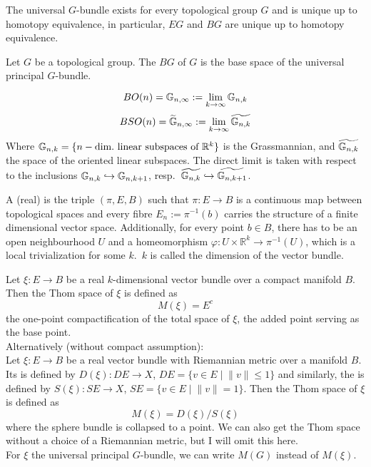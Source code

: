 \documentclass[a4paper,11pt]{article}
\begin{document}
\begin{remark}
    The universal \(G\)-bundle exists for every topological group \(G\) and is unique up to homotopy equivalence, in particular, \(EG\) and \(BG\) are unique up to homotopy equivalence.
\end{remark}

\begin{definition}
    Let \(G\) be a topological group. The  \(BG\) of \(G\) is the base space of the universal principal \(G\)-bundle.
\end{definition}

\begin{remark}\cite[p.32]{thom}
    \[BO(n)=\mathbb{G}_{n,\infty}:=\lim_{k\to\infty}\mathbb{G}_{n,k}\]
    \[BSO(n)=\widetilde{\mathbb{G}}_{n,\infty}:=\lim_{k\to\infty}\widetilde{\mathbb{G}_{n,k}}\]
    Where \(\mathbb{G}_{n,k}=\{n-\text{dim.\ linear subspaces of }\mathbb{R}^k\}\) is the Grassmannian, and \(\widetilde{\mathbb{G}_{n,k}}\) the space of the oriented linear subspaces. The direct limit is taken with respect to the inclusions \(\mathbb{G}_{n,k}\hookrightarrow\mathbb{G}_{n,k+1}\), resp.\ \(\widetilde{\mathbb{G}_{n,k}}\hookrightarrow\widetilde{\mathbb{G}_{n,k+1}}\).
\end{remark}

\begin{definition}
    A (real)  is the triple \((\pi,E,B)\) such that \(\pi:E\to B\) is a continuous map between topological spaces and every fibre \(E_n:=\pi^{-1}(b)\) carries the structure of a finite dimensional vector space.
    Additionally, for every point \(b\in B\), there has to be an open neighbourhood \(U\) and a homeomorphism \(\varphi:U\times\mathbb{R}^k\to\pi^{-1}(U)\), which is a local trivialization for some \(k\).\ \(k\) is called the dimension of the vector bundle.
\end{definition}

\begin{definition}
    Let \(\xi:E\to B\) be a real \(k\)-dimensional vector bundle over a compact manifold \(B\).
    Then the Thom space of \(\xi\) is defined as\[M(\xi)=E^c\] the one-point compactification of the total space of \(\xi\), the added point serving as the base point.\\
    Alternatively (without compact assumption):\\
    Let \(\xi:E\to B\) be a real vector bundle with Riemannian metric over a manifold \(B\). Its  is defined by \(D(\xi):DE\to X\), \(DE=\{v\in E\mid \lVert v\rVert \leq 1\}\) and similarly, the  is defined by \(S(\xi):SE\to X\), \(SE=\{v\in E\mid \lVert v\rVert = 1\}\). Then the Thom space of \(\xi\) is defined as
    \[M(\xi)=D(\xi)\big/S(\xi)\]
    where the sphere bundle is collapsed to a point. We can also get the Thom space without a choice of a Riemannian metric, but I will omit this here.\\
    For \(\xi\) the universal principal \(G\)-bundle, we can write \(M(G)\) instead of \(M(\xi)\).
\end{definition}
\end{document}
